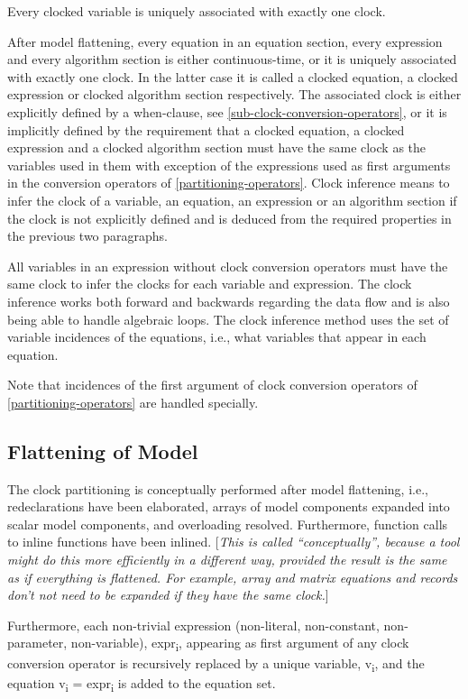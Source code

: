 \documentclass[10pt,a4paper]{report}
\def\doublelabel#1{\label{#1}\hypertarget{#1}{}}
\begin{document}
Every clocked variable is uniquely associated with exactly one clock.

After model flattening, every equation in an equation section, every
expression and every algorithm section is either continuous-time, or it
is uniquely associated with exactly one clock. In the latter case it is
called a clocked equation, a clocked expression or clocked algorithm
section respectively. The associated clock is either explicitly defined
by a when-clause, see \ref{sub-clock-conversion-operators}, or it is implicitly defined by the
requirement that a clocked equation, a clocked expression and a clocked
algorithm section must have the same clock as the variables used in them
with exception of the expressions used as first arguments in the
conversion operators of \ref{partitioning-operators}. Clock inference means to infer the
clock of a variable, an equation, an expression or an algorithm section
if the clock is not explicitly defined and is deduced from the required
properties in the previous two paragraphs.

All variables in an expression without clock conversion operators must
have the same clock to infer the clocks for each variable and
expression. The clock inference works both forward and backwards
regarding the data flow and is also being able to handle algebraic
loops. The clock inference method uses the set of variable incidences of
the equations, i.e., what variables that appear in each equation.

Note that incidences of the first argument of clock conversion operators
of \ref{partitioning-operators} are handled specially.

\subsection{Flattening of Model}\doublelabel{flattening-of-model}

The clock partitioning is conceptually performed after model flattening,
i.e., redeclarations have been elaborated, arrays of model components
expanded into scalar model components, and overloading resolved.
Furthermore, function calls to inline functions have been inlined.
{[}\emph{This is called ``conceptually'', because a tool might do this
more efficiently in a different way, provided the result is the same as
if everything is flattened. For example, array and matrix equations and
records don't not need to be expanded if they have the same clock.}{]}

Furthermore, each non-trivial expression (non-literal, non-constant,
non-parameter, non-variable), expr\textsubscript{i}, appearing as first
argument of any clock conversion operator is recursively replaced by a
unique variable, v\textsubscript{i}, and the equation v\textsubscript{i}
= expr\textsubscript{i} is added to the equation set.
\end{document}
